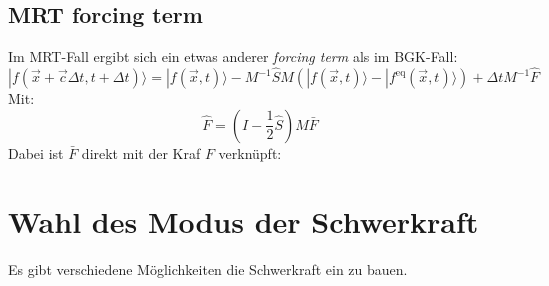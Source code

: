 \documentclass[a4paper,10pt]{scrreprt}
\begin{document}
\subsection{MRT forcing term}
Im MRT-Fall ergibt sich ein etwas anderer \emph{forcing term} als im BGK-Fall:
\begin{equation}
 | f(\vec{x} + \vec{c} \Delta t, t + \Delta t) \rangle = | f(\vec{x},t) \rangle - M^{-1} \hat{S} M \left( | f(\vec{x},t) \rangle - | f^{\text{eq}}(\vec{x},t) \rangle \right) + \Delta t M^{-1} \hat{F} 
\end{equation}
Mit:
\begin{equation}
 \hat{F} = \left( I - \frac{1}{2} \hat{S} \right) M \bar{F}
\end{equation}
Dabei ist $\bar{F}$ direkt mit der Kraf $F$ verknüpft:




\section{Wahl des Modus der Schwerkraft}
Es gibt verschiedene Möglichkeiten die Schwerkraft ein zu bauen. 

\appendix
\end{document}

